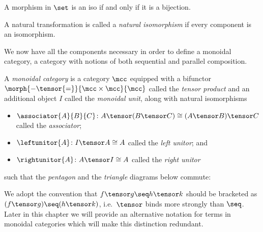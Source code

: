 \begin{example}
    A morphism in \(\set\) is an iso if and only if it is a bijection.
\end{example}

\begin{definition}
    A natural transformation is called a \emph{natural isomorphism} if every
    component is an isomorphism.
\end{definition}

We now have all the components necessary in order to define a monoidal category,
a category with notions of both sequential and parallel composition.

\begin{definition}
    \label{def:monoidal-category}
    A \emph{monoidal category} is a category \(\mcc\) equipped with a
    bifunctor \(\morph{{-} \tensor {=}}{\mcc \times \mcc}{\mcc}\) called the
    \emph{tensor product} and an additional object \(I\) called the
    \emph{monoidal unit},
    along with natural isomorphisms
    \begin{itemize}
        \item \(
            \associator{A}{B}{C}
            \colon
            A \tensor (B \tensor C)
            \cong
            (A \tensor B) \tensor C
            \) called the \emph{associator};
        \item \(
            \leftunitor{A}
            \colon
            I \tensor A
            \cong
            A
            \) called the \emph{left unitor}; and
        \item \(
            \rightunitor{A}
            \colon
            A \tensor I
            \cong
            A
            \) called the \emph{right unitor}
    \end{itemize}
    such that the \emph{pentagon} and the \emph{triangle} diagrams below
    commute:
    \begin{center}
        

        \vspace{1em}

        
    \end{center}
\end{definition}

We adopt the convention that \(f \tensor g \seq h \tensor k\) should be
bracketed as \((f \tensor g) \seq (h \tensor k)\), i.e.\ \(\tensor\) binds
more strongly than \(\seq\).
Later in this chapter we will provide an alternative notation for terms
in monoidal categories which will make this distinction redundant.

